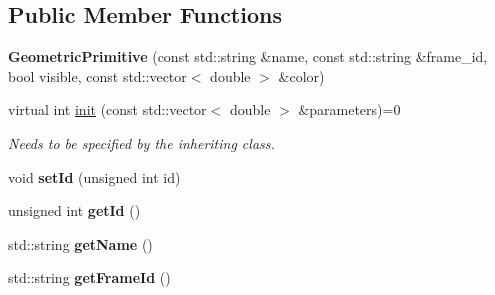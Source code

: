\subsection*{Public Member Functions}
\begin{DoxyCompactItemize}
\item 
\hypertarget{classhiqp_1_1geometric__primitives_1_1GeometricPrimitive_a4dfa06c8f664ce1206d09ecd7b6d4b22}{{\bfseries Geometric\-Primitive} (const std\-::string \&name, const std\-::string \&frame\-\_\-id, bool visible, const std\-::vector$<$ double $>$ \&color)}\label{classhiqp_1_1geometric__primitives_1_1GeometricPrimitive_a4dfa06c8f664ce1206d09ecd7b6d4b22}

\item 
\hypertarget{classhiqp_1_1geometric__primitives_1_1GeometricPrimitive_a3697e5afb0121715280da649b8bd711d}{virtual int \hyperlink{classhiqp_1_1geometric__primitives_1_1GeometricPrimitive_a3697e5afb0121715280da649b8bd711d}{init} (const std\-::vector$<$ double $>$ \&parameters)=0}\label{classhiqp_1_1geometric__primitives_1_1GeometricPrimitive_a3697e5afb0121715280da649b8bd711d}

\begin{DoxyCompactList}\small\item\em Needs to be specified by the inheriting class. \end{DoxyCompactList}\item 
\hypertarget{classhiqp_1_1geometric__primitives_1_1GeometricPrimitive_adb67fd231dcc0d5b544ece9f0fa1bdf5}{void {\bfseries set\-Id} (unsigned int id)}\label{classhiqp_1_1geometric__primitives_1_1GeometricPrimitive_adb67fd231dcc0d5b544ece9f0fa1bdf5}

\item 
\hypertarget{classhiqp_1_1geometric__primitives_1_1GeometricPrimitive_a7c07e7e6d768a5b92b6b08950aac9df6}{unsigned int {\bfseries get\-Id} ()}\label{classhiqp_1_1geometric__primitives_1_1GeometricPrimitive_a7c07e7e6d768a5b92b6b08950aac9df6}

\item 
\hypertarget{classhiqp_1_1geometric__primitives_1_1GeometricPrimitive_a9e3448f020001187585f48f164ae54ea}{std\-::string {\bfseries get\-Name} ()}\label{classhiqp_1_1geometric__primitives_1_1GeometricPrimitive_a9e3448f020001187585f48f164ae54ea}

\item 
\hypertarget{classhiqp_1_1geometric__primitives_1_1GeometricPrimitive_a358c7a2b87edc3142e1975047e3fbdad}{std\-::string {\bfseries get\-Frame\-Id} ()}\label{classhiqp_1_1geometric__primitives_1_1GeometricPrimitive_a358c7a2b87edc3142e1975047e3fbdad}


\end{DoxyCompactItemize}
